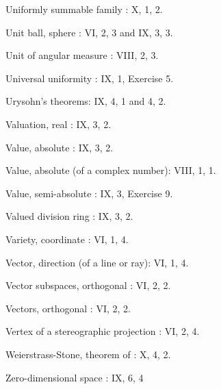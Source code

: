 Uniformly summable family : X, 1, 2.

Unit ball, sphere : VI, 2, 3 and IX, 3, 3.

Unit of angular measure : VIII, 2, 3.

Universal uniformity : IX, 1, Exercise 5.

Urysohn's theorems: IX, 4, 1 and 4, 2.

Valuation, real : IX, 3, 2.

Value, absolute : IX, 3, 2.

Value, absolute (of a complex number): VIII, 1, 1.

Value, semi-absolute : IX, 3, Exercise 9.

Valued division ring : IX, 3, 2.

Variety, coordinate : VI, 1, 4.

Vector, direction (of a line or ray): VI, 1, 4.

Vector subspaces, orthogonal : VI, 2, 2.

Vectors, orthogonal : VI, 2, 2.

Vertex of a stereographic projection : VI, 2, 4.

Weierstrass-Stone, theorem of : X, 4, 2.

Zero-dimensional space : IX, 6, 4
